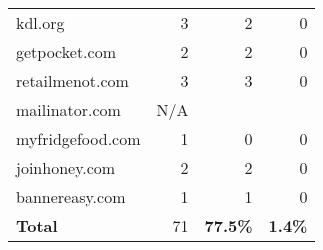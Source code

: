 \begin{table}
\begin{tabular}{lrrr}
    kdl.org           & 3                                                                       & 2                                                                                        & 0                                                                                      \\
    getpocket.com     & 2                                                                       & 2                                                                                        & 0                                                                                      \\
    retailmenot.com   & 3                                                                       & 3                                                                                        & 0                                                                                      \\
    mailinator.com    & N/A                                                                     &                                                                                          &                                                                                        \\
    myfridgefood.com  & 1                                                                       & 0                                                                                        & 0                                                                                      \\
    joinhoney.com     & 2                                                                       & 2                                                                                        & 0                                                                                      \\
    bannereasy.com    & 1                                                                       & 1                                                                                        & 0                                                                                      \\ \hline
    \textbf{Total}    & 71                                                                      & \textbf{77.5\%}                                                                          & \textbf{1.4\%}                                                                        
    \end{tabular}
    \end{table}




